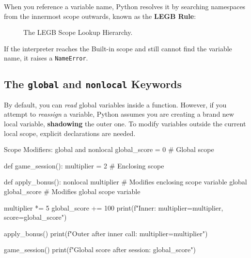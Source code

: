 When you reference a variable name, Python resolves it by searching namespaces from the innermost scope outwards, known as the \textbf{LEGB Rule}:

\begin{figure}[htbp]
\centering
{}
\caption{The LEGB Scope Lookup Hierarchy.}
\label{fig:legb-scope}
\end{figure}

If the interpreter reaches the Built-in scope and still cannot find the variable name, it raises a \texttt{NameError}.

\subsection{The \texttt{global} and \texttt{nonlocal} Keywords}
By default, you can \textit{read} global variables inside a function. However, if you attempt to \textit{reassign} a variable, Python assumes you are creating a brand new local variable, \textbf{shadowing} the outer one. To modify variables outside the current local scope, explicit declarations are needed.

\begin{pythoncode}{Scope Modifiers: global and nonlocal}
global_score = 0  # Global scope

def game_session():
    multiplier = 2  # Enclosing scope
    
    def apply_bonus():
        nonlocal multiplier # Modifies enclosing scope variable
        global global_score # Modifies global scope variable
        
        multiplier *= 5
        global_score += 100
        print(f"Inner: multiplier={multiplier}, score={global_score}")
        
    apply_bonus()
    print(f"Outer after inner call: multiplier={multiplier}")

game_session()
print(f"Global score after session: {global_score}")
\end{pythoncode}

